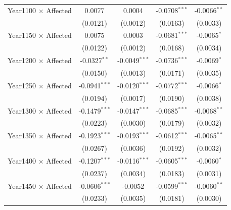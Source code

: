 \begin{table}[H]
\begin{tabular}{lcccc}
   Year1100 $\times$ Affected                       & 0.0077          & 0.0004          & -0.0708$^{***}$       & -0.0066$^{**}$\\   
                                                    & (0.0121)        & (0.0012)        & (0.0163)              & (0.0033)\\   
   Year1150 $\times$ Affected                       & 0.0075          & 0.0003          & -0.0681$^{***}$       & -0.0065$^{*}$\\   
                                                    & (0.0122)        & (0.0012)        & (0.0168)              & (0.0034)\\   
   Year1200 $\times$ Affected                       & -0.0327$^{**}$  & -0.0049$^{***}$ & -0.0736$^{***}$       & -0.0069$^{*}$\\   
                                                    & (0.0150)        & (0.0013)        & (0.0171)              & (0.0035)\\   
   Year1250 $\times$ Affected                       & -0.0941$^{***}$ & -0.0120$^{***}$ & -0.0772$^{***}$       & -0.0066$^{*}$\\   
                                                    & (0.0194)        & (0.0017)        & (0.0190)              & (0.0038)\\   
   Year1300 $\times$ Affected                       & -0.1479$^{***}$ & -0.0147$^{***}$ & -0.0685$^{***}$       & -0.0068$^{**}$\\   
                                                    & (0.0223)        & (0.0030)        & (0.0179)              & (0.0032)\\   
   Year1350 $\times$ Affected                       & -0.1923$^{***}$ & -0.0193$^{***}$ & -0.0612$^{***}$       & -0.0065$^{**}$\\   
                                                    & (0.0267)        & (0.0036)        & (0.0192)              & (0.0032)\\   
   Year1400 $\times$ Affected                       & -0.1207$^{***}$ & -0.0116$^{***}$ & -0.0605$^{***}$       & -0.0060$^{*}$\\   
                                                    & (0.0237)        & (0.0034)        & (0.0183)              & (0.0031)\\   
   Year1450 $\times$ Affected                       & -0.0606$^{***}$ & -0.0052         & -0.0599$^{***}$       & -0.0060$^{**}$\\   
                                                    & (0.0233)        & (0.0035)        & (0.0181)              & (0.0030)\\   

\end{tabular}
\end{table}
